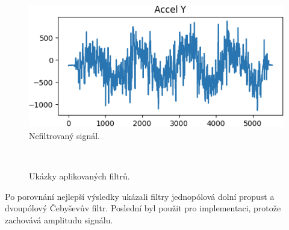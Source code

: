 \begin{figure}[!h]
	\centering
	\vspace{-5pt}
    \includegraphics[width = 0.7\linewidth]{Figures/NoFilter.png}
    \caption{Nefiltrovaný signál.}
    \label{fig:NoFilter}
    \vspace{-10pt}
\end{figure}

\begin{figure}[!h]
    \centering
     \\
    \caption{Ukázky aplikovaných filtrů.}
    \label{fig:filters}
\end{figure}

Po porovnání nejlepší výsledky ukázali filtry jednopólová dolní propust a 
dvoupólový Čebyševův filtr. Poslední byl použit pro implementaci, 
protože zachovává amplitudu signálu.
\endinput
